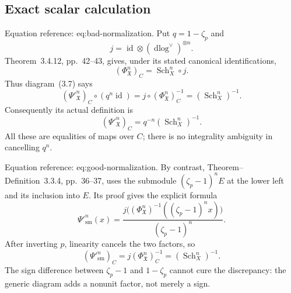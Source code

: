 \documentclass[10pt]{article}
\begin{document}
\subsection*{Exact scalar calculation}
Equation reference: eq:bad-normalization. Put \(q=1-\zeta_p\) and \[j=\operatorname{id}\otimes(\operatorname{dlog}^{\vee})^{\otimes n}.\] Theorem 3.4.12, pp. 42–43, gives, under its stated canonical identifications, \[(\Phi^n_{\mathfrak X})_C=\operatorname{Sch}_X^n\circ j.\] Thus diagram (3.7) says \[(\Psi'^n_{\mathfrak X})_C\circ(q^n\operatorname{id})
       =j\circ(\Phi^n_{\mathfrak X})_C^{-1}
       =(\operatorname{Sch}_X^n)^{-1}.\] Consequently its actual definition is \[
(\Psi'^n_{\mathfrak X})_C=q^{-n}(\operatorname{Sch}_X^n)^{-1}.\] All these are equalities of maps over \(C\); there is no integrality ambiguity in cancelling \(q^n\).\par
Equation reference: eq:good-normalization. By contrast, Theorem–Definition 3.3.4, pp. 36–37, uses the submodule \((\zeta_p-1)^nE\) at the lower left and its inclusion into \(E\). Its proof gives the explicit formula \[\Psi'^n_{\mathrm{sm}}(x)
 =\frac{j\big((\Phi^n_{\mathfrak X})^{-1}((\zeta_p-1)^nx)\big)}
              {(\zeta_p-1)^n}.\] After inverting \(p\), linearity cancels the two factors, so \[
(\Psi'^n_{\mathrm{sm}})_C
   =j(\Phi^n_{\mathfrak X})_C^{-1}=(\operatorname{Sch}_X^n)^{-1}.\] The sign difference between \(\zeta_p-1\) and \(1-\zeta_p\) cannot cure the discrepancy: the generic diagram adds a nonunit factor, not merely a sign.\par
\end{document}
